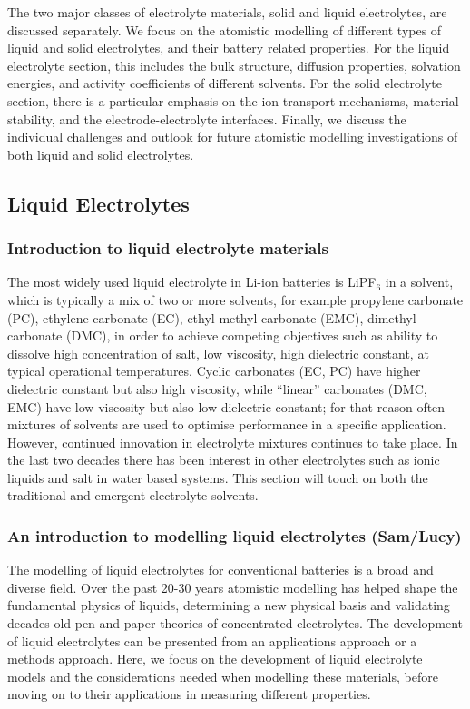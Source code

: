 \documentclass[../main.tex]{subfiles}
\begin{document}
The two major classes of electrolyte materials, solid and liquid electrolytes, are discussed separately. We focus on the atomistic modelling of different types of liquid and solid electrolytes, and their battery related properties. For the liquid electrolyte section, this includes the bulk structure, diffusion properties, solvation energies, and activity coefficients of different solvents. For the solid electrolyte section, there is a particular emphasis on the ion transport mechanisms, material stability, and the electrode-electrolyte interfaces. Finally, we discuss the individual challenges and outlook for future atomistic modelling investigations of both liquid and solid electrolytes.

\subsection{Liquid Electrolytes}
\label{sec:Liquid_electrolytes}
\subsubsection{Introduction to liquid electrolyte materials}
The most widely used liquid electrolyte in Li-ion batteries is LiPF$_6$ in a solvent, which is typically a mix of two or more solvents, for example propylene carbonate (PC), ethylene carbonate (EC), ethyl methyl carbonate (EMC), dimethyl carbonate (DMC), in order to achieve competing objectives such as ability to dissolve high concentration of salt, low viscosity, high dielectric constant, at typical operational temperatures.\cite{Xu2004,Xu2014, Logan2020, Valo_en_2005,TARASCON19931221} Cyclic carbonates (EC, PC) have higher dielectric constant but also high viscosity, while ``linear'' carbonates (DMC, EMC) have low viscosity but also low dielectric constant; for that reason often mixtures of solvents are used to optimise performance in a specific application.\cite{Logan2020,Yamada_2013,TARASCON19931221} However, continued innovation in electrolyte mixtures continues to take place. In the last two decades there has been interest in other electrolytes such as ionic liquids\cite{macfarlane2014energy} and salt in water based systems\cite{suo2016advanced}. This section will touch on both the traditional and emergent electrolyte solvents.

\subsubsection{An introduction to modelling liquid electrolytes (Sam/Lucy)}
The modelling of liquid electrolytes for conventional batteries is a broad and diverse field. Over the past 20-30 years atomistic modelling has helped shape the fundamental physics of liquids, determining a new physical basis and validating decades-old pen and paper theories of concentrated electrolytes. \cite{qian2015high,kim2015situ,zhou2009atomistic,enderby1981structure} The development of liquid electrolytes can be presented from an applications approach or a methods approach. Here, we focus on the development of liquid electrolyte models and the considerations needed when modelling these materials, before moving on to their applications in measuring different properties.
\end{document}
